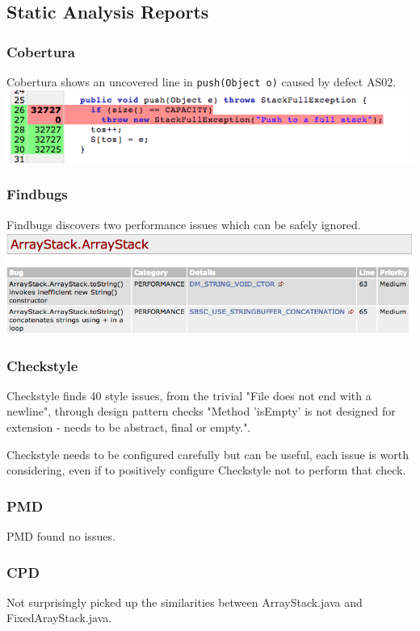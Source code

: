 \documentclass [12pt, a4paper, twoside, titlepage] {article}
\begin{document}
\subsection{Static Analysis Reports}
\subsubsection{Cobertura}
Cobertura shows an uncovered line in \texttt{push(Object o)} caused by defect AS02.\\

\includegraphics{cobertura.png}



\subsubsection{Findbugs}
Findbugs discovers two performance issues which can be safely ignored.\\
\includegraphics[width=18cm]{findbugs.png}

\subsubsection{Checkstyle}
Checkstyle finds 40 style issues, from the trivial "File does not end with a newline", through design pattern checks  
"Method 'isEmpty' is not designed for extension - needs to be abstract, final or empty.". 

Checkstyle needs to be configured carefully but can be useful, each issue is worth considering, 
even if to positively configure Checkstyle not to perform that check.

\subsubsection{PMD}
PMD found no issues.

\subsubsection{CPD}
Not surprisingly picked up the similarities between ArrayStack.java and FixedArayStack.java.
\end{document}
